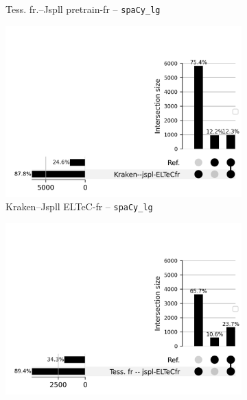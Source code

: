 \begin{figure}[h!]
\begin{minipage}{6.5cm}
\begin{subfigure}{0.8\textwidth}
  \caption{Tess. fr.--Jspll pretrain-fr -- \texttt{spaCy\_lg}}
 \label{fig:ELTeCFRA_Tess. fr -- jspl-fr_spacy-lg-concat_intersection.png}
  \end{subfigure}
    \end{minipage}
\begin{minipage}{6.5cm}
  \begin{subfigure}{0.8\textwidth}
  \includegraphics[width=1\textwidth]{REVUETAL_article_23102023/IMAGES/ELTeC_INTERSECTIONS_spaCy3.5.1_12072024/DATA_ELTeC-fra_spaCy3.5.1_Kraken--jspl-ELTeCfr_upsetplot.png} 
  \caption{Kraken--Jspll ELTeC-fr -- \texttt{spaCy\_lg}}
  \label{fig:ELTeCFRA_Kraken -- jspl-ELTeCfr_spacy-lg-concat_intersection}
  \end{subfigure}
  \end{minipage}
  \begin{minipage}{6.5cm}
  \begin{subfigure}{0.8\textwidth}
  \includegraphics[width=1\textwidth]{REVUETAL_article_23102023/IMAGES/ELTeC_INTERSECTIONS_spaCy3.5.1_12072024/DATA_ELTeC-fra_spaCy3.5.1_Tess. fr -- jspl-ELTeCfr_upsetplot.png} %

\end{subfigure}
\end{minipage}
\end{figure}
